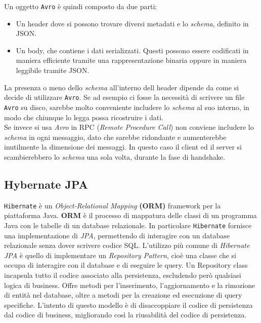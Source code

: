 Un oggetto \texttt{Avro} è quindi composto da due parti: 
\begin{itemize}
    \item Un header dove si possono trovare diversi metadati e lo \textit{schema}, definito in JSON.
    \item Un body, che contiene i dati serializzati.
    Questi possono essere codificati in maniera efficiente tramite una rappresentazione binaria oppure in maniera leggibile tramite JSON.
\end{itemize}
La presenza o meno dello \textit{schema} all'interno dell header dipende da come si decide di utilizzare \texttt{Avro}.
Se ad esempio ci fosse la necessità di scrivere un file \texttt{Avro} su disco, sarebbe molto conveniente includere lo \textit{schema} al suo interno,
in modo che chiunque lo legga possa ricostruire i dati.\\
Se invece si usa \textit{Avro} in RPC (\textit{Remote Procedure Call}) non conviene includere lo \textit{schema} in ogni messaggio,
dato che sarebbe ridondante e aumenterebbe inutilmente la dimensione dei messaggi.
In questo caso il client ed il server si scambierebbero lo \textit{schema} una sola volta, durante la fase di handshake.

\subsection{Hybernate JPA}
\label{subsec:hibernate_overview}
\texttt{Hibernate} è un \textit{Object-Relational Mapping} \textbf{(ORM)} framework per la piattaforma Java.
\textbf{ORM} è il processo di mappatura delle classi di un programma Java con le tabelle di un database relazionale.
In particolare \texttt{Hibernate} fornisce una implementazione di \textit{JPA}, permettendo di interagire con un database relazionale senza dover scrivere codice SQL.
L'utilizzo più comune di \textit{Hibernate JPA} è quello di implementare un \textit{Repository Pattern}, cioè una classe che si occupa di interagire con il database e di eseguire le query.
Un Repository class incapsula tutto il codice associato alla persistenza, escludendo però qualsiasi logica di business. 
Offre metodi per l'inserimento, l'aggiornamento e la rimozione di entità nel database, oltre a metodi per la creazione ed esecuzione di query specifiche.
L'intento di questo modello è di disaccoppiare il codice di persistenza dal codice di business, migliorando così la riusabilità del codice di persistenza.\\\\
